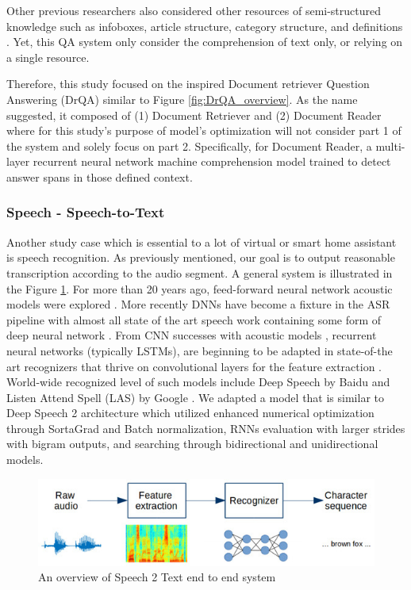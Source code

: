 Other previous researchers also considered other resources of semi-structured knowledge such as infoboxes, article structure, category structure, and definitions \cite{}. Yet, this QA system only consider the comprehension of text only, or relying on a single resource.
    
    






Therefore, this study focused on the inspired Document retriever Question Answering (DrQA) similar to Figure \ref{fig:DrQA_overview}. As the name suggested, it composed of (1) Document Retriever and (2) Document Reader where for this study's purpose of model's optimization will not consider part 1 of the system and solely focus on part 2. Specifically, for Document
Reader, a multi-layer recurrent neural network
machine comprehension model trained to detect
answer spans in those defined context.




\subsubsection{Speech - Speech-to-Text}

Another study case which is essential to a lot of virtual or smart home assistant is speech recognition. As previously mentioned, our goal is to output reasonable transcription according to the audio segment. A general system is illustrated in the Figure \ref{fig:speech2text}. For more than 20 years ago, feed-forward
neural network acoustic models were explored \cite{}.  More recently DNNs have become a fixture in the ASR pipeline with almost all
state of the art speech work containing some form of deep neural network \cite{}. From CNN successes with acoustic models \cite{}, recurrent
neural networks (typically LSTMs), are beginning to be adapted in state-of-the art recognizers \cite{} that thrive on convolutional layers for the feature extraction \cite{}. World-wide recognized level of such models include Deep Speech by Baidu \cite{} and Listen Attend Spell (LAS) by Google \cite{}. We adapted a model that is similar to Deep Speech 2 architecture \cite{} which utilized enhanced numerical optimization through SortaGrad and Batch normalization, RNNs evaluation with larger strides with bigram outputs, and searching through bidirectional and unidirectional models.


\begin{figure}[!t]
    \centering
    \includegraphics[width=\linewidth]{img/speech2text.jpg}
    \caption{An overview of Speech 2 Text end to end system}
    \label{fig:speech2text}
\end{figure}

